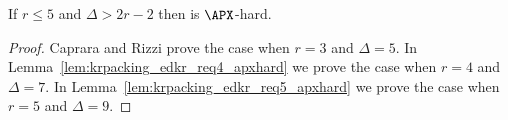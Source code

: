 \begin{thm}
\label{thm:krpacking_edkr345apxhard}
If $r \leq 5$ and $\Delta > 2r - 2$ then \edkr is $\APX$-hard.
\end{thm}
\begin{proof}
Caprara and Rizzi \cite{caprara_packing_2002} prove the case when $r = 3$ and $\Delta = 5$. In Lemma~\ref{lem:krpacking_edkr_req4_apxhard} we prove the case when $r=4$ and $\Delta=7$. In Lemma~\ref{lem:krpacking_edkr_req5_apxhard} we prove the case when $r=5$ and $\Delta=9$.
\end{proof}






